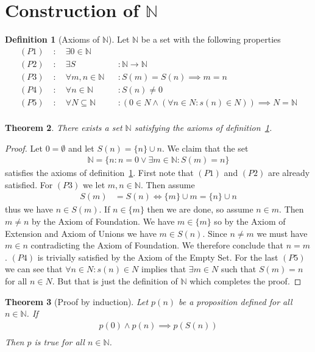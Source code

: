 \documentclass[a4paper,11pt]{article}
\theoremstyle{plain}
\newtheorem{theorem}{Theorem}
\theoremstyle{definition}
\newtheorem{definition}[theorem]{Definition}
\newcommand{\N}{\mathbb{N}}
\newcommand{\iff}{\Longleftrightarrow}
\begin{document}
\section{Construction of $\N$}
\begin{definition}[Axioms of $\N$]\label{nat axioms}
	Let $\N$ be a set with the following properties
	\begin{align*}
		(P1)\; &:\quad \exists 0\in\N\\
		(P2)\; &:\quad \exists S &&:\N\rightarrow\N\\
		(P3)\; &:\quad \forall m,n\in\N &&: S(m)=S(n)\implies m=n\\
		(P4)\; &:\quad \forall n\in\N &&: S(n)\neq 0\\
		(P5)\; &:\quad \forall N\subseteq\N &&: 
		(0\in N\land(\forall n\in N:s(n)\in N))\implies N=\N\\
	\end{align*}
\end{definition}
\begin{theorem}\label{nat proof}
	There exists a set $\N$ satisfying the axioms of
	definition~\ref{nat axioms}.
\end{theorem}
\begin{proof}
	Let $0=\emptyset$ and let $S(n)=\{n\}\cup n$. We claim that the set
	\begin{align*}
		\N =\{n:n=0\lor\exists m\in\N:S(m)=n\}
	\end{align*}
	satisfies the axioms of definition~\ref{nat axioms}. First note
	that $(P1)$ and $(P2)$ are already satisfied. For $(P3)$ we let
	$m,n\in\N$. Then assume
	\begin{align*}
		S(m)&=S(n)\iff \{m\}\cup m=\{n\}\cup n
	\end{align*}
	thus we have $n\in S(m)$. If $n\in\{m\}$ then we are done, so assume $n\in
	m$. Then $m\neq n$ by the Axiom of Foundation. We have $m\in \{m\}$ so by
	the Axiom of Extension and Axiom of Unions we have $m\in S(n)$. Since $n\neq
	m$ we must have $m\in n$ contradicting the Axiom of Foundation. We therefore
	conclude that $n=m$. $(P4)$ is trivially satisfied by the Axiom of the Empty
	Set. For the last $(P5)$ we can see that $\forall n\in N:s(n)\in N$ implies
	that $\exists m\in N$ such that $S(m)=n$ for all $n \in N$. But that is just
	the definition of $\N$ which completes the proof.
\end{proof}
\begin{theorem}[Proof by induction]\label{induction}
	Let $p(n)$ be a proposition defined for all $n\in \N$. If
	\begin{align*}
		p(0) \land p(n)\implies p(S(n))\\
	\end{align*}
	Then $p$ is true for all $n\in \N$.
\end{theorem}
\end{document}
